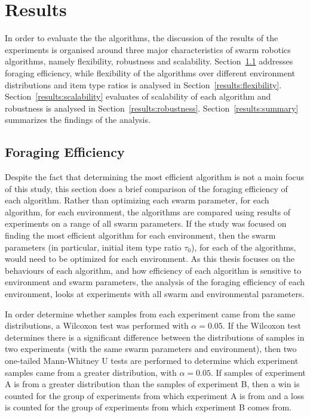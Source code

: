 \chapter{Results}
\label{chap:results}

In order to evaluate the the algorithms, the discussion of the results of the experiments is organised around three major characteristics of swarm robotics algorithms, namely flexibility, robustness and scalability. Section~\ref{results:efficiency} addresses foraging efficiency, while flexibility of the algorithms over different environment distributions and item type ratios is analysed in Section~\ref{results:flexibility}. Section~\ref{results:scalability} evaluates of scalability of each algorithm and robustness is analysed in Section~\ref{results:robustness}. Section~\ref{results:summary} summarizes the findings of the analysis.

\section{Foraging Efficiency}
\label{results:efficiency}

Despite the fact that determining the most efficient algorithm is not a main focus of this study, this section does a brief comparison of the foraging efficiency of each algorithm. Rather than optimizing each swarm parameter, for each algorithm, for each environment, the algorithms are compared using results of experiments on a range of all swarm parameters. If the study was focused on finding the most efficient algorithm for each environment, then the swarm parameters (in particular, initial item type ratio $\tau_0$), for each of the algorithms, would need to be optimized for each environment. As this thesis focuses on the behaviours of each algorithm, and how efficiency of each algorithm is sensitive to environment and swarm parameters, the analysis of the foraging efficiency of each environment, looks at experiments with all swarm and environmental parameters.

In order determine whether samples from each experiment came from the same distributions, a Wilcoxon test was performed with $\alpha=0.05$. If the Wilcoxon test determines there is a significant difference between the distributions of samples in two experiments (with the same swarm parameters and environment), then two one-tailed Mann-Whitney U tests are performed to determine which experiment samples came from a greater distribution, with $\alpha=0.05$. If samples of experiment A is from a greater distribution than the samples of experiment B, then a win is counted for the group of experiments from which experiment A is from and a loss is counted for the group of experiments from which experiment B comes from.


